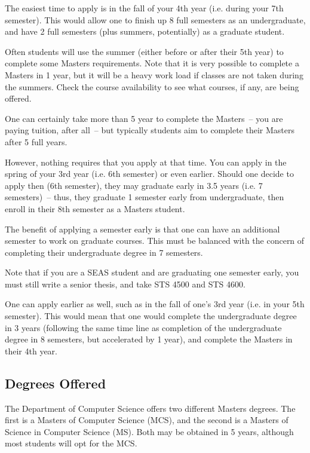 \documentclass[10pt,letter]{book}
\begin{document}
The easiest time to apply is in the fall of your 4th year (i.e. during
your 7th semester).  This would allow one to finish up 8 full
semesters as an undergraduate, and have 2 full semesters (plus
summers, potentially) as a graduate student.

Often students will use the summer (either before or after their 5th
year) to complete some Masters requirements.  Note that it is very
possible to complete a Masters in 1 year, but it will be a heavy work
load if classes are not taken during the summers.  Check the course
availability to see what courses, if any, are being offered.

One can certainly take more than 5 year to complete the Masters~-- you
are paying tuition, after all~-- but typically students aim to
complete their Masters after 5 full years.

However, nothing requires that you apply at that time.  You can apply
in the spring of your 3rd year (i.e. 6th semester) or even earlier.
Should one decide to apply then (6th semester), they may graduate
early in 3.5 years (i.e. 7 semesters)~-- thus, they graduate 1
semester early from undergraduate, then enroll in their 8th semester
as a Masters student.

The benefit of applying a semester early is that one can have an
additional semester to work on graduate courses.  This must be
balanced with the concern of completing their undergraduate degree in
7 semesters.

Note that if you are a SEAS student and are graduating one semester
early, you must still write a senior thesis, and take STS 4500 and STS
4600.

One can apply earlier as well, such as in the fall of one's 3rd year
(i.e. in your 5th semester).  This would mean that one would complete
the undergraduate degree in 3 years (following the same time line as
completion of the undergraduate degree in 8 semesters, but accelerated
by 1 year), and complete the Masters in their 4th year.


\subsection{Degrees Offered}

The Department of Computer Science offers two different Masters
degrees.  The first is a Masters of Computer Science (MCS), and the
second is a Masters of Science in Computer Science (MS).  Both may be
obtained in 5 years, although most students will opt for the MCS.
\end{document}
